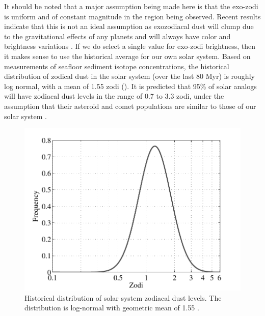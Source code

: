 It should be noted that a major assumption being made here is that the exo-zodi is uniform and of constant magnitude in the region being observed.  Recent results indicate that this is not an ideal assumption as exozodiacal dust will clump due to the gravitational effects of any planets and will always have color and brightness variations \citep{kuchner2010collisional}.  If we do select a single value for exo-zodi brightness, then it makes sense to use the historical average for our own solar system.  Based on measurements of seafloor sediment isotope concentrations, the historical distribution of zodical dust in the solar system (over the last 80 Myr) is roughly log normal, with a mean of 1.55 zodi ().  It is predicted that 95\% of solar analogs will have zodiacal dust levels in the range of 0.7 to 3.3 zodi, under the assumption that their asteroid and comet populations are similar to those of our solar system \citep{kuchner2008}.
\begin{figure}[ht]
 \begin{center}
   \includegraphics[width=4.5in,clip=true,trim=0.2in 0in 0.5in 0in]{./figures/zodi_dist}
 \end{center}
 \caption[Historical distribution of solar system zodi]{ \label{fig:zodi_dist} Historical distribution of solar system zodiacal dust levels. The distribution is log-normal with geometric mean of 1.55 \citep{kuchner2008}.}
 \end{figure}

